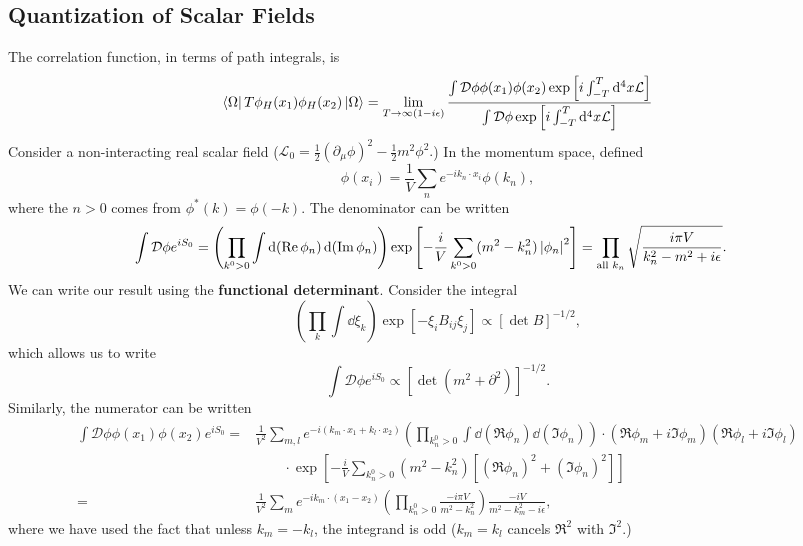 \documentclass{article}
\begin{document}
\subsection{Quantization of Scalar Fields}
The correlation function, in terms of path integrals, is 
\begin{equation}
    \bra\Omega T\phi_H(x_1)\phi_H(x_2)\ket\Omega=\lim_{T\to\infty(1-i\epsilon)}\frac{\int\mathcal D\phi\phi(x_1)\phi(x_2)\exp\left[i\int^T_{-T}\dd^4x\mathcal L\right]}{\int\mathcal D\phi\exp\left[i\int^T_{-T}\dd^4x\mathcal L\right]}\label{4correlation}
\end{equation}
Consider a non-interacting real scalar field ($\mathcal L_0=\frac 12(\partial_\mu\phi)^2-\frac 12m^2\phi^2.$) In the momentum space, defined 
$$\phi(x_i)=\frac 1V\sum_{n}e^{-ik_n\cdot x_i}\phi(k_n),$$
where the $n>0$ comes from $\phi^*(k)=\phi(-k)$. The denominator can be written 
\begin{align*}
    \int\mathcal D\phi e^{iS_0}&=\left(\prod_{k^0>0}\int\dd(\Re\phi_n)\dd(\Im\phi_n)\right)\exp\left[-\frac iV\sum_{k^0>0}(m^2-k^2_n)\left\lvert\phi_n\right\rvert^2\right]=\prod_{\text{all }k_n}\sqrt{\frac{i\pi V}{k^2_n-m^2+i\epsilon}}.
\end{align*}
We can write our result using the \textbf{functional determinant}. Consider the integral
\begin{equation}
    \left(\prod_k\int\dd\xi_k\right)\exp\left[-\xi_iB_{ij}\xi_j\right]\propto\left[\det B\right]^{-1/2},
\end{equation}
which allows us to write 
\begin{equation}
    \int\mathcal D\phi e^{iS_0}\propto\left[\det(m^2+\partial^2)\right]^{-1/2}.
\end{equation}
Similarly, the numerator can be written 
\begin{align*}
    \int\mathcal D\phi\phi(x_1)\phi(x_2)e^{iS_0}=&\frac 1{V^2}\sum_{m,l}e^{-i(k_m\cdot x_1+k_l\cdot x_2)}\left(\prod_{k^0_n>0}\int\dd(\Re\phi_n)\dd(\Im\phi_n)\right)\cdot(\Re\phi_m+i\Im\phi_m)(\Re\phi_l+i\Im\phi_l)\\
    &\qquad\cdot\exp\left[-\frac iV\sum_{k^0_n>0}(m^2-k^2_n)\left[(\Re\phi_n)^2+(\Im\phi_n)^2\right]\right]\\
    =&\frac 1{V^2}\sum_me^{-ik_m\cdot(x_1-x_2)}\left(\prod_{k^0_n>0}\frac{-i\pi V}{m^2-k_n^2}\right)\frac{-iV}{m^2-k_m^2-i\epsilon},
\end{align*}
where we have used the fact that unless $k_m=-k_l$, the integrand is odd ($k_m=k_l$ cancels $\Re^2$ with $\Im^2$.) 
\end{document}
